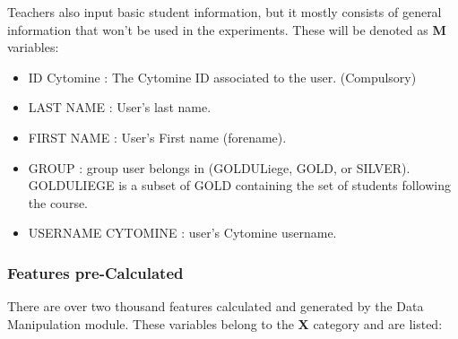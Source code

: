 \documentclass[a4paper,11pt]{report}
\numberwithin{figure}{section} %
\begin{document}
    Teachers also input basic student information, but it mostly consists of general information that won't be used in the experiments. These will be denoted as \textbf{M} variables:
   	\begin{itemize}
   	\item[\textbullet] ID Cytomine : The Cytomine ID associated to the user. (Compulsory)
    \item[\textbullet] LAST NAME : User's last name.
    \item[\textbullet] FIRST NAME : User's First name (forename).
    \item[\textbullet] GROUP : group user belongs in (GOLDULiege, GOLD, or SILVER). GOLDULIEGE is a subset of GOLD containing the set of students following the course.
    \item[\textbullet] USERNAME CYTOMINE : user's Cytomine username.
   	\end{itemize}
    
    
    \subsubsection{Features pre-Calculated}
    
    There are over two thousand features calculated and generated by the Data Manipulation module. These variables belong to the \textbf{X} category and are listed: 
   
\end{document}
